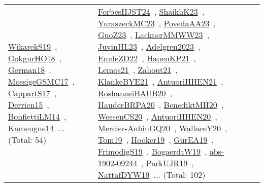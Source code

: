 {\begin{longtable}{lp{3cm}>{\raggedright\arraybackslash}p{6cm}>{\raggedright\arraybackslash}p{6cm}>{\raggedright\arraybackslash}p{8cm}}
\href{works/WikarekS19.pdf}{WikarekS19}~\cite{WikarekS19}, \href{works/GokgurHO18.pdf}{GokgurHO18}~\cite{GokgurHO18}, \href{works/German18.pdf}{German18}~\cite{German18}, \href{works/MossigeGSMC17.pdf}{MossigeGSMC17}~\cite{MossigeGSMC17}, \href{works/CappartS17.pdf}{CappartS17}~\cite{CappartS17}, \href{works/Derrien15.pdf}{Derrien15}~\cite{Derrien15}, \href{works/BonfiettiLM14.pdf}{BonfiettiLM14}~\cite{BonfiettiLM14}, \href{works/Kameugne14.pdf}{Kameugne14}~\cite{Kameugne14}... (Total: 54) & \href{works/ForbesHJST24.pdf}{ForbesHJST24}~\cite{ForbesHJST24}, \href{works/ShaikhK23.pdf}{ShaikhK23}~\cite{ShaikhK23}, \href{works/YuraszeckMC23.pdf}{YuraszeckMC23}~\cite{YuraszeckMC23}, \href{works/PovedaAA23.pdf}{PovedaAA23}~\cite{PovedaAA23}, \href{works/GuoZ23.pdf}{GuoZ23}~\cite{GuoZ23}, \href{works/LacknerMMWW23.pdf}{LacknerMMWW23}~\cite{LacknerMMWW23}, \href{works/JuvinHL23.pdf}{JuvinHL23}~\cite{JuvinHL23}, \href{works/Adelgren2023.pdf}{Adelgren2023}~\cite{Adelgren2023}, \href{works/EmdeZD22.pdf}{EmdeZD22}~\cite{EmdeZD22}, \href{works/HanenKP21.pdf}{HanenKP21}~\cite{HanenKP21}, \href{works/Lemos21.pdf}{Lemos21}~\cite{Lemos21}, \href{works/Zahout21.pdf}{Zahout21}~\cite{Zahout21}, \href{works/KlankeBYE21.pdf}{KlankeBYE21}~\cite{KlankeBYE21}, \href{works/AntuoriHHEN21.pdf}{AntuoriHHEN21}~\cite{AntuoriHHEN21}, \href{works/RoshanaeiBAUB20.pdf}{RoshanaeiBAUB20}~\cite{RoshanaeiBAUB20}, \href{works/HauderBRPA20.pdf}{HauderBRPA20}~\cite{HauderBRPA20}, \href{works/BenediktMH20.pdf}{BenediktMH20}~\cite{BenediktMH20}, \href{works/WessenCS20.pdf}{WessenCS20}~\cite{WessenCS20}, \href{works/AntuoriHHEN20.pdf}{AntuoriHHEN20}~\cite{AntuoriHHEN20}, \href{works/Mercier-AubinGQ20.pdf}{Mercier-AubinGQ20}~\cite{Mercier-AubinGQ20}, \href{works/WallaceY20.pdf}{WallaceY20}~\cite{WallaceY20}, \href{works/Tom19.pdf}{Tom19}~\cite{Tom19}, \href{works/Hooker19.pdf}{Hooker19}~\cite{Hooker19}, \href{works/GurEA19.pdf}{GurEA19}~\cite{GurEA19}, \href{works/FrimodigS19.pdf}{FrimodigS19}~\cite{FrimodigS19}, \href{works/BogaerdtW19.pdf}{BogaerdtW19}~\cite{BogaerdtW19}, \href{works/abs-1902-09244.pdf}{abs-1902-09244}~\cite{abs-1902-09244}, \href{works/ParkUJR19.pdf}{ParkUJR19}~\cite{ParkUJR19}, \href{works/NattafDYW19.pdf}{NattafDYW19}~\cite{NattafDYW19}... (Total: 102)\\

\end{longtable}}

